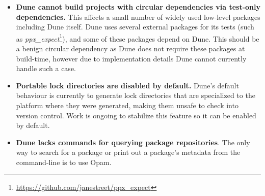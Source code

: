\documentclass{article}
\begin{document}
\begin{multicols}{2}
        \begin{itemize}
            \item \textbf{Dune cannot build projects with circular dependencies
                via test-only dependencies.} This affects a small number of
                widely used low-level packages including Dune itself. Dune uses
                several external packages for its tests (such as
                \textit{ppx\_expect}\footnote{\url{https://github.com/janestreet/ppx_expect}}),
                and some of these packages depend on
                Dune. This should be a benign circular dependency as Dune does
                not require these packages at build-time, however due to
                implementation details Dune cannot currently handle such a case.
            \item \textbf{Portable lock directories are disabled by default.}
                Dune's default behaviour is currently to generate lock
                directories that are specialized to the platform where they were
                generated, making them unsafe to check into version control.
                Work is ongoing to stabilize this feature so it can be enabled
                by default.
            \item \textbf{Dune lacks commands for querying package
                repositories}. The only way to search for a package or print out
                a package's metadata from the command-line is to use Opam.
        \end{itemize}

    \end{multicols}
\end{document}
